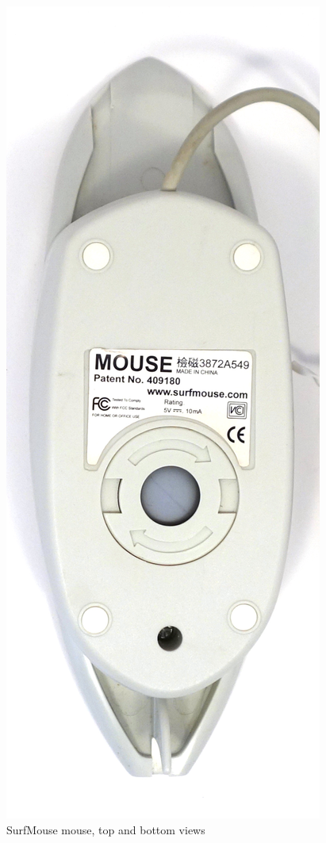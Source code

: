 \documentclass[11pt, a4paper]{article}
\begin{document}
\begin{figure}[h]
    \includegraphics[scale=0.46]{2000_surf_mouse/bottom_60.jpg}
    \caption{SurfMouse mouse, top and bottom views}
    \label{fig:SurfMouseTopBottom}
\end{figure}
\end{document}
